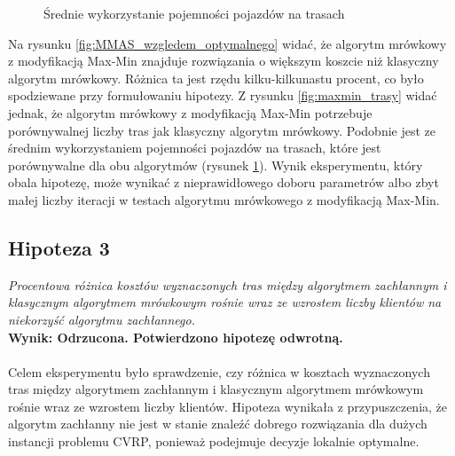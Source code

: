 \documentclass{article}
\begin{document}
\begin{figure}[H]
\begin{minipage}{0.48\textwidth}
        \caption{Średnie wykorzystanie pojemności pojazdów na trasach}
        \label{fig:max_min_capacity}
    \end{minipage}
\end{figure}

\noindent Na rysunku \ref{fig:MMAS_wzgledem_optymalnego} widać, że algorytm mrówkowy z modyfikacją Max-Min znajduje rozwiązania o większym koszcie niż klasyczny algorytm mrówkowy. Różnica ta jest rzędu kilku-kilkunastu procent, co było spodziewane przy formułowaniu hipotezy. Z rysunku \ref{fig:maxmin_trasy} widać jednak, że algorytm mrówkowy z modyfikacją Max-Min potrzebuje porównywalnej liczby tras jak klasyczny algorytm mrówkowy. Podobnie jest ze średnim wykorzystaniem pojemności pojazdów na trasach, które jest porównywalne dla obu algorytmów (rysunek \ref{fig:max_min_capacity}). Wynik eksperymentu, który obala hipotezę, może wynikać z nieprawidłowego doboru parametrów albo zbyt małej liczby iteracji w testach algorytmu mrówkowego z modyfikacją Max-Min.

\subsection{Hipoteza 3}
\textit{Procentowa różnica kosztów wyznaczonych tras między algorytmem zachłannym i klasycznym algorytmem mrówkowym rośnie wraz ze wzrostem liczby klientów na niekorzyść algorytmu zachłannego.}
\\
\textbf{Wynik: Odrzucona. Potwierdzono hipotezę odwrotną.}
\\ \\
Celem eksperymentu było sprawdzenie, czy różnica w kosztach wyznaczonych tras między algorytmem zachłannym i klasycznym algorytmem mrówkowym rośnie wraz ze wzrostem liczby klientów. Hipoteza wynikała z przypuszczenia, że algorytm zachłanny nie jest w stanie znaleźć dobrego rozwiązania dla dużych instancji problemu CVRP, ponieważ podejmuje decyzje lokalnie optymalne.
\end{document}
